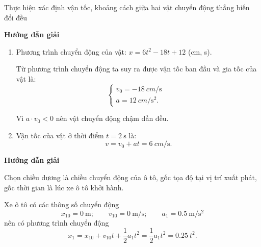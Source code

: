 \begin{dang}{Thực hiện xác định vận tốc, khoảng cách giữa hai vật chuyển động thẳng biến đổi đều}
	{	\begin{center}
			\textbf{Hướng dẫn giải}
		\end{center}
		
		\begin{enumerate}[label=\alph*)]
			\item
			Phương trình chuyển động của vật: $x=6t^2-18t+12$ (cm, s).
			
			Từ phương trình chuyển động ta suy ra được vận tốc ban đầu và gia tốc của vật là:
			\begin{equation*}
				\left\{\begin{array}{ll}{v_0=\SI{-18}{cm/\second}}&\\{a=\SI{12}{cm/\second^2}.}&\end{array}\right.
			\end{equation*}
			
			Vì $a\cdot v_0 < 0$ nên vật chuyển động chậm dần đều.
			\item 
			Vận tốc của vật ở thời điểm $t=\SI{2}{\second}$ là:
			\begin{equation*}
				v=v_0+at=\SI{6}{cm/\second}.
			\end{equation*}
		\end{enumerate}
	}
	{	\begin{center}
			\textbf{Hướng dẫn giải}
		\end{center}
		
		Chọn chiều dương là chiều chuyển động của ô tô, gốc tọa độ tại vị trí xuất phát, gốc thời gian là lúc xe ô tô khởi hành.
		
		Xe ô tô có các thông số chuyển động 
		$$x_{10} = \SI{0}{\meter};\qquad  v_{10} = \SI{0}{\meter/\second};\qquad a_1 = \SI{0.5}{\meter
			/\second^{2}}$$	
		nên có phương trình chuyển động 
		$$x_1 = x_{10}+v_{10}t+\dfrac{1}{2}a_{1}t^{2}=\dfrac{1}{2}a_1t^2=\SI{0.25}{}t^{2}.$$
		
}
\end{dang}

